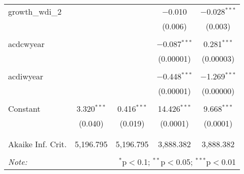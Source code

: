 \begin{table}[!htbp]
\begin{tabular}{@{\extracolsep{5pt}}lcccc}
 growth\_wdi\_2 &  &  & $-$0.010 & $-$0.028$^{***}$ \\ 
  &  &  & (0.006) & (0.003) \\ 
  & & & & \\ 
 acdcwyear &  &  & $-$0.087$^{***}$ & 0.281$^{***}$ \\ 
  &  &  & (0.00001) & (0.00003) \\ 
  & & & & \\ 
 acdiwyear &  &  & $-$0.448$^{***}$ & $-$1.269$^{***}$ \\ 
  &  &  & (0.00001) & (0.00000) \\ 
  & & & & \\ 
 Constant & 3.320$^{***}$ & 0.416$^{***}$ & 14.426$^{***}$ & 9.668$^{***}$ \\ 
  & (0.040) & (0.019) & (0.0001) & (0.0001) \\ 
  & & & & \\ 
\hline \\[-1.8ex] 
Akaike Inf. Crit. & 5,196.795 & 5,196.795 & 3,888.382 & 3,888.382 \\ 
\hline 
\hline \\[-1.8ex] 
\textit{Note:}  & \multicolumn{4}{r}{$^{*}$p$<$0.1; $^{**}$p$<$0.05; $^{***}$p$<$0.01} \\ 
\end{tabular} 
\end{table} 
